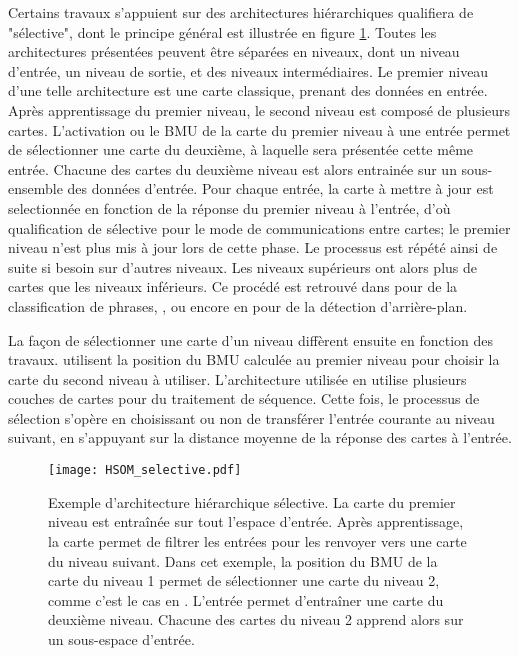 \documentclass[../main]{subfiles}
\begin{document}
Certains travaux s'appuient sur des architectures hiérarchiques qualifiera de "sélective", dont le principe général est illustrée en figure \ref{fig:hsom_selective}. Toutes les architectures présentées peuvent être séparées en niveaux, dont un niveau d'entrée, un niveau de sortie, et des niveaux intermédiaires.
Le premier niveau d'une telle architecture est une carte classique, prenant des données en entrée. 
Après apprentissage du premier niveau, le second niveau est composé de plusieurs cartes.
L'activation ou le BMU de la carte du premier niveau à une entrée permet de sélectionner une carte du deuxième, à laquelle sera présentée cette même entrée. 
Chacune des cartes du deuxième niveau est alors entrainée sur un sous-ensemble des données d'entrée. Pour chaque entrée, la carte à mettre à jour est selectionnée en fonction de la réponse du premier niveau à l'entrée, d'où
qualification de sélective pour le mode de communications entre cartes; le premier niveau n'est plus mis à jour lors de cette phase.
Le processus est répété ainsi de suite si besoin sur d'autres niveaux. Les niveaux supérieurs ont alors plus de cartes que les niveaux inférieurs.
Ce procédé est retrouvé dans \cite{barbalho_hierarchical_2001,suganthan_pattern_2001}
\cite{miikkulainen_script_1992} pour de la classification de phrases, \cite{dittenbach_growing_2000,ordonez_hierarchical_2010}, ou encore en \cite{zhao_stacked_2015} pour de la détection d'arrière-plan.

La façon de sélectionner une carte d'un niveau diffèrent ensuite en fonction des travaux.
\cite{barbalho_hierarchical_2001} utilisent la position du BMU calculée au premier niveau pour choisir la carte du second niveau à utiliser. L'architecture utilisée en \cite{zhao_stacked_2015} utilise plusieurs couches de cartes pour du traitement de séquence. Cette fois, le processus de sélection s'opère en choisissant ou non de transférer l'entrée courante au niveau suivant, en s'appuyant sur la distance moyenne de la réponse des cartes à l'entrée.

\begin{figure}
    \texttt{[image: HSOM\_selective.pdf]}
    \caption{Exemple d'architecture hiérarchique sélective. La carte du premier niveau est entraînée sur tout l'espace d'entrée. Après apprentissage, la carte permet de filtrer les entrées pour les renvoyer vers une carte du niveau suivant. Dans cet exemple, la position du BMU de la carte du niveau 1 permet de sélectionner une carte du niveau 2, comme c'est le cas en \cite{barbalho_hierarchical_2001}. 
    L'entrée permet d'entraîner une carte du deuxième niveau. Chacune des cartes du niveau 2 apprend alors sur un sous-espace d'entrée.\label{fig:hsom_selective}}
\end{figure}
\end{document}
